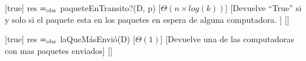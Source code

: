 \begin{Interfaz}
  [true]%
  {res $=_{\mathrm{obs}}$ paqueteEnTransito?(D, p)}%
  [$\Theta(n \times log(k))$]%
  [Devuelve ``True'' si y solo si el paquete esta en los paquetes en espera de alguna computadora. ]%
  []%

  [true]%
  {res $=_{\mathrm{obs}}$ laQueM\'asEnvi\'o(D)}%
  [$\Theta(1)$]%
  [Devuelve una de las computadoras con mas paquetes enviados]%
  []%


\end{Interfaz}

